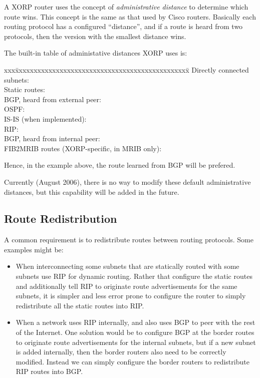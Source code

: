 A XORP router uses the concept of {\it administrative distance} to
determine which route wins.  This concept is the same as that used by
Cisco routers.  Basically each routing protocol has a configured
``distance'', and if a route is heard from two protocols, then the
version with the smallest distance wins.

The built-in table of administative distances XORP uses is:
\begin{tabbing}
xxx\=xxxxxxxxxxxxxxxxxxxxxxxxxxxxxxxxxxxxxxxxxxxxxxx\=\kill
\>Directly connected subnets: \\
\>Static routes:\\
\>BGP, heard from external peer:\\
\>OSPF:\\
\>IS-IS (when implemented):\\
\>RIP:\\
\>BGP, heard from internal peer:\\
\>FIB2MRIB routes (XORP-specific, in MRIB only):
\end{tabbing}
Hence, in the example above, the route learned from BGP will be prefered.

Currently (August 2006), there is no way to modify these default
administrative distances, but this capability will be added in the future.

\subsection{Route Redistribution}

A common requirement is to redistribute routes between routing
protocols.  Some examples might be:

\begin{itemize}
\item When interconnecting some subnets that are statically routed
  with some subnets use RIP for dynamic routing.  Rather
  that configure the static routes and additionally tell RIP to
  originate route advertisements for the same subnets, it is simpler
  and less error prone to configure the router to simply redistribute
  all the static routes into RIP.
\item When a network uses RIP internally, and also uses BGP to
  peer with the rest of the Internet.  One solution would be to
  configure BGP at the border routes to originate route advertisements
  for the internal subnets, but if a new subnet is added internally,
  then the border routers also need to be correctly modified.  Instead
  we can simply configure the border routers to redistribute RIP
  routes into BGP.  
\end{itemize}

